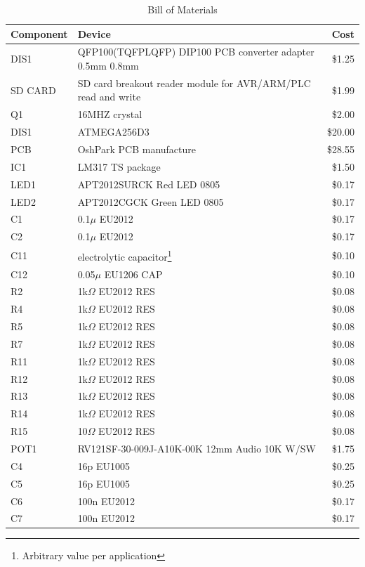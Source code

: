 \documentclass[bibtotocnumbered,abstract=on,paper=a4,fontsize=12pt,parskip=on,halfparskip=on]{scrartcl}		%
\begin{document}
    \begin{table}[H]
    \caption{Bill of Materials}
    \vskip 0.3cm
    \small
    \begin{tabularx}{\textwidth}{  p{2cm} X r }
      \textbf{Component} & \textbf{Device} & \textbf{Cost} \\
      \hline
      DIS1 &  QFP100(TQFPLQFP) DIP100 PCB converter adapter 0.5mm 0.8mm & \$1.25 \\
      SD CARD & SD card breakout reader module for AVR/ARM/PLC read and write & \$1.99 \\
      Q1 & 16MHZ crystal & \$2.00 \\
      DIS1 & ATMEGA256D3 & \$20.00 \\
      PCB & OshPark PCB manufacture  & \$28.55 \\
      IC1 & LM317 TS package & \$1.50 \\
      LED1 & APT2012SURCK Red LED 0805 & \$0.17 \\
      LED2 & APT2012CGCK Green LED 0805 & \$0.17 \\
      C1 & 0.1$\mu$ EU2012 & \$0.17 \\
      C2 & 0.1$\mu$ EU2012 & \$0.17 \\
      C11 & electrolytic capacitor\footnote{Arbitrary value per application} & \$0.10 \\
      C12 & 0.05$\mu$ EU1206 CAP & \$0.10 \\
      R2 & 1k$\Omega$ EU2012 RES & \$0.08 \\
      R4 & 1k$\Omega$ EU2012 RES & \$0.08 \\
      R5 & 1k$\Omega$ EU2012 RES & \$0.08 \\
      R7 & 1k$\Omega$ EU2012 RES & \$0.08 \\
      R11 & 1k$\Omega$ EU2012 RES & \$0.08 \\
      R12 & 1k$\Omega$ EU2012 RES & \$0.08 \\
      R13 & 1k$\Omega$ EU2012 RES & \$0.08 \\
      R14 & 1k$\Omega$ EU2012 RES & \$0.08 \\
      R15 & 10$\Omega$ EU2012 RES & \$0.08 \\
      POT1 & RV121SF-30-009J-A10K-00K 12mm Audio 10K W/SW & \$1.75 \\
      C4 & 16p EU1005 & \$0.25 \\
      C5 & 16p EU1005 & \$0.25 \\
      C6 & 100n EU2012 & \$0.17 \\
      C7 & 100n EU2012 & \$0.17 \\

\end{tabularx}
\end{table}
\end{document}
